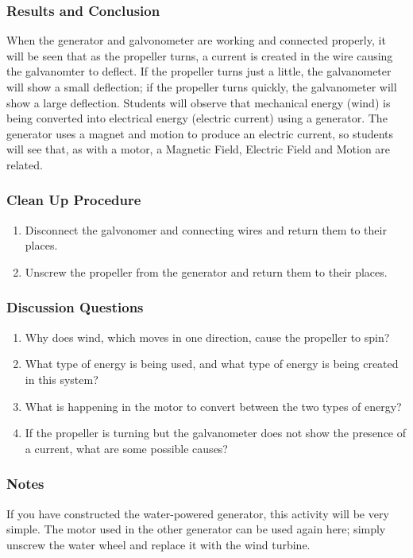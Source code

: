 \subsubsection*{Results and Conclusion}
When the generator and galvonometer are working and connected properly, it will be seen that as the propeller turns, a current is created in the wire causing the galvanomter to deflect. If the propeller turns just a little, the galvanometer will show a small deflection; if the propeller turns quickly, the galvanometer will show a large deflection.  
Students will observe that mechanical energy (wind) is being converted into electrical energy (electric current) using a generator. The generator uses a magnet and motion to produce an electric current, so students will see that, as with a motor, a Magnetic Field, Electric Field and Motion are related.  

\subsubsection*{Clean Up Procedure}
\begin{enumerate}
\item{Disconnect the galvonomer and connecting wires and return them to their places.} 
\item{Unscrew the propeller from the generator and return them to their places.} 
\end{enumerate}

\subsubsection*{Discussion Questions}
\begin{enumerate}
\item{Why does wind, which moves in one direction, cause the propeller to spin?}
\item{What type of energy is being used, and what type of energy is being created in this system?}
\item{What is happening in the motor to convert between the two types of energy?}
\item{If the propeller is turning but the galvanometer does not show the presence of a current, what are some possible causes?}
\end{enumerate}

\subsubsection*{Notes}
If you have constructed the water-powered generator, this activity will be very simple.  The motor used in the other generator can be used again here; simply unscrew the water wheel and replace it with the wind turbine.
